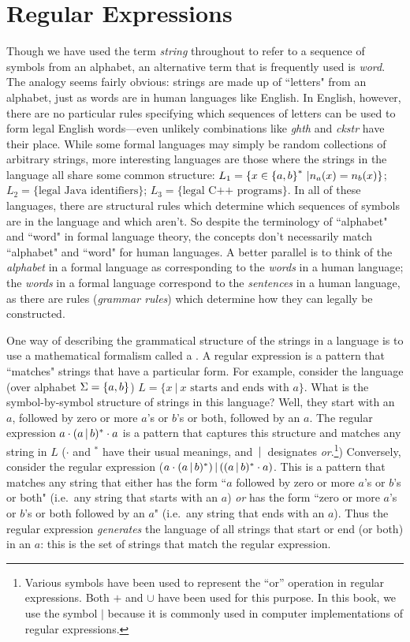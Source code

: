 \section{Regular Expressions}

Though we have used the term {\em string} throughout to refer to a sequence of
symbols from an alphabet, an alternative term that is frequently used is {\em
word}.  The analogy seems fairly obvious: strings are made up of ``letters"
from an alphabet, just as words are in human languages like English.
In English, however, there are no particular rules specifying which sequences 
of letters can be used to form legal English words---even unlikely
combinations like {\em ghth} and {\em ckstr} have their place.  
While some formal languages may simply
be random collections of arbitrary strings, more interesting languages
are those where the strings in the language all share some 
common structure:  $L_1 = \{ x\in \mbox{$\{a,b\}$}^* \ | n_a(x) =
n_b(x)\}$; $L_2 = \{\mbox{legal Java identifiers}\}$; $L_3 = \{\mbox{legal C++
programs}\}$.  In all of these languages, there are structural 
rules which determine which sequences of symbols are in the language and which
aren't.
So
despite the terminology of ``alphabet" and ``word" in formal
language theory, the concepts don't necessarily match ``alphabet"
and ``word" for human languages.  A better parallel is to think of
the {\em alphabet} in a formal language as corresponding to the {\em words} in a
human language; the {\em words} in a formal language correspond to
the {\em sentences} in a human language, as there are rules ({\em grammar 
rules}) which determine how they can legally be constructed.

One way of describing the grammatical structure of the strings in a language is
to use a mathematical formalism called a .  A regular
expression is a pattern that ``matches" strings that have a particular form.  For
example, consider the language (over alphabet $\Sigma = \mbox{$\{a,b\}$}$) $L= \{x \ | \ x
\mbox{\ starts and ends with\ } a\}$.  What is the symbol-by-symbol 
structure of
strings in this language?  Well, they start with an $a$, followed by zero or more
$a$'s or $b$'s or both, followed by an $a$.  The regular expression 
$a \cdot (a \hbox{$\,|\,$} b)^* \cdot a$ is a pattern that captures this structure and matches any string in
$L$ ($\cdot$ and $^*$ have their usual meanings, and $\hbox{$\,|\,$} $ designates {\em or}.\footnote{Various
symbols have been used to represent the ``or'' operation in regular expressions.  Both
$+$ and $\cup$ have been used for this purpose.  In this book, we use the symbol $|$ because
it is commonly used in computer implementations of regular expressions.}) 
Conversely, consider the regular expression ($a\cdot(a\hbox{$\,|\,$} b)^*) \hbox{$\,|\,$}  ((a\hbox{$\,|\,$} b)^*\cdot a)$.
This is a pattern that matches any string that either has the form ``$a$ followed
by zero or more $a$'s or $b$'s or both" (i.e.\ any string that starts with an $a$)
{\em or} has the form ``zero or more $a$'s or $b$'s or both followed by an $a$"
(i.e.\ any string that ends with an $a$).  Thus the regular expression 
{\em generates} the language of all strings that start or end (or both) in an
$a$: this is the set of strings that match the regular expression. 

